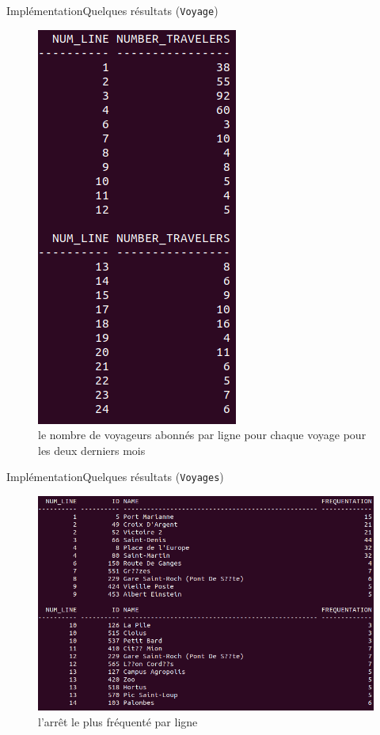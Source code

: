 \documentclass[a4paper,12pt,usenames,dvipsnames]{beamer}
\begin{document}
\begin{frame}{Implémentation}{Quelques résultats (\texttt{Voyage})}
\begin{figure}[!ht]
  \centering
  \includegraphics[scale=0.3]{images/requetes_analytiques/requ2.png}
  \caption{le nombre de voyageurs abonnés par ligne pour chaque voyage pour les deux derniers mois}
\end{figure}
\end{frame}

\begin{frame}{Implémentation}{Quelques résultats (\texttt{Voyages})}
\begin{figure}[!ht]
  \centering
  \includegraphics[scale=0.3]{images/requetes_analytiques/requ3.png}
  \caption{l'arrêt le plus fréquenté par ligne}
\end{figure}
\end{frame}
\end{document}
